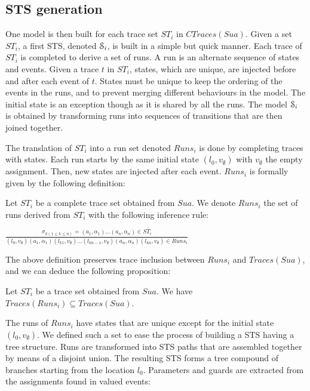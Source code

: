 \subsection{STS generation}
\label{sec:modelinf:prodsystems:generation}

One model is then built for each trace set $ST_i$ in
$CTraces(Sua)$. Given a set $ST_i$, a first STS, denoted
$\EuScript{S}_i$, is built in a simple but quick manner. Each
trace of $ST_i$ is completed to derive a set of runs. A run is an
alternate sequence of states and events. Given a trace $t$ in
$ST_i$, states, which are unique, are injected before and after
each event of $t$. States must be unique to keep the ordering of
the events in the runs, and to prevent merging different
behaviours in the model.  The initial state is an exception
though as it is shared by all the runs. The model
$\EuScript{S}_i$ is obtained by transforming runs into sequences
of transitions that are then joined together.

The translation of $ST_i$ into a run set denoted $Runs_i$ is done
by completing traces with states. Each run starts by the same
initial state $(l_0,v_\emptyset)$ with $v_\emptyset$ the empty
assignment. Then, new states are injected after each event.
$Runs_i$ is formally given by the following definition:

\begin{definition}
    Let $ST_i$ be a complete trace set obtained from $Sua$. We
denote $Runs_i$ the set of runs derived from $ST_i$ with the
following inference rule:
  \begin{center}
    $\frac{\sigma_{k(1\leq k \leq n)}=(a_1,\alpha_1)...(a_n,\alpha_n) \in ST_i}
    {(l_0,v_\emptyset) (a_1,\alpha_1) (l_{k1},v_\emptyset) \dots (l_{kn-1},v_\emptyset) (a_n,\alpha_n) (l_{kn},v_\emptyset) \in Runs_i}$
  \end{center}
\end{definition}

The above definition preserves trace inclusion between $Runs_i$
and $Traces(Sua)$, and we can deduce the following proposition:

\begin{proposition}
Let $ST_i$ be a trace set obtained from $Sua$. We have
$Traces(Runs_i) \subseteq Traces(Sua)$.
\end{proposition}

The runs of $Runs_i$ have states that are unique except for the
initial state $(l_0,v_\emptyset)$. We defined such a set to
ease the process of building a STS having a tree structure.  Runs
are transformed into STS paths that are assembled together by
means of a disjoint union. The resulting STS forms a tree
compound of branches starting from the location $l_0$. Parameters
and guards are extracted from the assignments found in valued
events:

